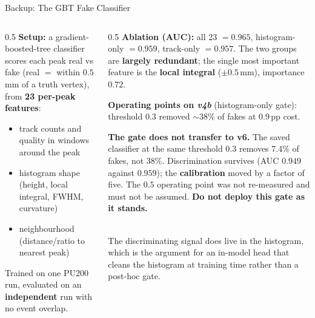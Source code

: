 \documentclass[xcolor=table,aspectratio=169]{beamer}
\begin{document}
\begin{frame}{Backup: The GBT Fake Classifier}
    \begin{columns}[c]
        \begin{column}{0.5\linewidth}
            \small
            \textbf{Setup:} a gradient-boosted-tree classifier scores each peak real vs
            fake (real $=$ within $0.5$\,mm of a truth vertex), from \textbf{23 per-peak features}:
            \begin{itemize}\setlength\itemsep{0.2em}
                \item track counts and quality in windows around the peak
                \item histogram shape (height, local integral, FWHM, curvature)
                \item neighbourhood (distance/ratio to nearest peak)
            \end{itemize}
            \vspace{0.35em}
            Trained on one PU200 run, evaluated on an \textbf{independent} run with no event overlap.
        \end{column}
        \begin{column}{0.5\linewidth}
            \small
            \textbf{Ablation (AUC):} all 23 $=0.965$, histogram-only $=0.959$, track-only $=0.957$.
            The two groups are \textbf{largely redundant}; the single most important feature is the
            \textbf{local integral} ($\pm0.5$\,mm), importance $0.72$.
            \vspace{0.4em}

            \textbf{Operating points on \emph{v4b}} (histogram-only gate):
            threshold $0.3$ removed ${\sim}38\%$ of fakes at $0.9$\,pp cost.
            \vspace{0.35em}

            \setlength{\fboxsep}{4pt}
            \colorbox{pennred!8}{\parbox{0.95\linewidth}{\footnotesize
            \textcolor{pennred}{\textbf{The gate does not transfer to v6.}} The saved
            classifier at the same threshold $0.3$ removes \textbf{$7.4\%$} of fakes,
            not $38\%$. Discrimination survives (AUC $0.949$ against $0.959$); the
            \textbf{calibration} moved by a factor of five. The $0.5$ operating point
            was not re-measured and must not be assumed. \textbf{Do not deploy this
            gate as it stands.}}}
            \vspace{0.35em}\\
            {\footnotesize\textcolor{black!55}{The discriminating signal does live in
            the histogram, which is the argument for an in-model head that cleans the
            histogram at training time rather than a post-hoc gate.}}
        \end{column}
    \end{columns}
\end{frame}
\end{document}
